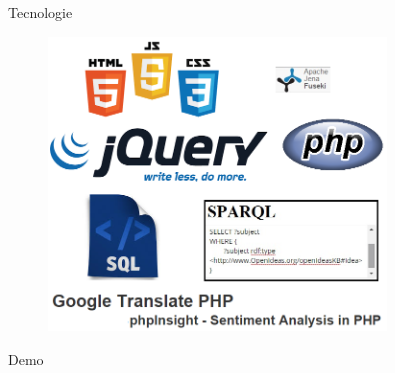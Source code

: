 \documentclass{beamer}
\begin{document}
\begin{frame}{Tecnologie}
	
	\begin{figure}
		\centering
			\includegraphics[width=0.8\textwidth]{img/technologies.png}
		\label{fig:technologies}
	\end{figure}
	
\end{frame}


\begin{frame}{Demo}
	
	\begin{center}
		\href{http://localhost/WebSemantico/OpenIdeas/index.php}{}
	\end{center}
\end{frame}
\end{document}
